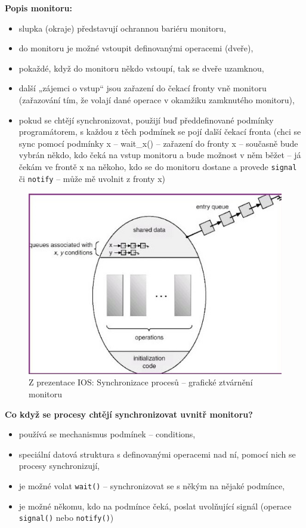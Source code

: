 \documentclass[a4paper, 11pt]{article}
\newcommand{\tcmd}[1]{\texttt{#1}}
\begin{document}
\newpage
\textbf{Popis monitoru:}
\begin{itemize}
    \item slupka (okraje) představují ochrannou bariéru monitoru,
    \item do monitoru je možné vstoupit definovanými operacemi (dveře),
    \item pokaždé, když do monitoru někdo vstoupí, tak se dveře uzamknou,
    \item další „zájemci o vstup“ jsou zařazení do čekací fronty vně monitoru (zařazování tím, že volají dané operace v okamžiku zamknutého monitoru),
    \item pokud se chtějí synchronizovat, použijí buď předdefinované podmínky programátorem, s každou z těch podmínek se pojí další čekací fronta (chci se sync pomocí podmínky x -- wait\_x() -- zařazení do fronty x -- současně bude vybrán někdo, kdo čeká na vstup monitoru a bude možnost v něm běžet -- já čekám ve frontě x na někoho, kdo se do monitoru dostane a provede \tcmd{signal} či \tcmd{notify} -- může mě uvolnit z fronty x)
\end{itemize}

\begin{figure} [h]
    \centering
    \includegraphics[scale=2]{11.1_2.jpg}
    \caption{Z prezentace IOS: Synchronizace procesů -- grafické ztvárnění monitoru}
\end{figure}

\textbf{Co když se procesy chtějí synchronizovat uvnitř monitoru?}
\begin{itemize}
    \item používá se mechanismus podmínek -- conditions,
    \item speciální datová struktura s definovanými operacemi nad ní, pomocí nich se procesy synchronizují,
    \item je možné volat \tcmd{wait()} -- synchronizovat se s někým na nějaké podmínce,
    \item je možné někomu, kdo na podmínce čeká, poslat uvolňující signál (operace \tcmd{signal()} nebo \tcmd{notify()})
\end{itemize}
 
\end{document}
